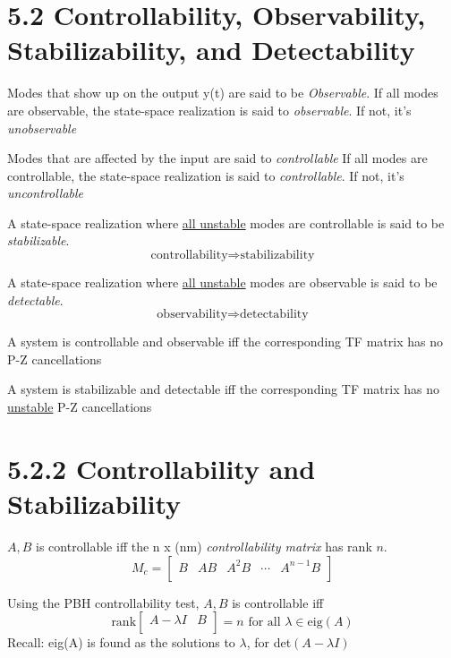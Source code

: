 
\section*{5.2 Controllability, Observability, Stabilizability, and Detectability}
Modes that show up on the output y(t) are said to be \textit{Observable}.
If all modes are observable, the state-space realization is said to \textit{observable}.
If not, it's \textit{unobservable}

Modes that are affected by the input are said to \textit{controllable}
If all modes are controllable, the state-space realization is said to \textit{controllable}.
If not, it's \textit{uncontrollable}

A state-space realization where \underline{all unstable} modes are controllable is said to be \textit{stabilizable}.
\begin{equation*}
    \text{controllability} \Rightarrow \text{stabilizability}
\end{equation*}

A state-space realization where \underline{all unstable} modes are observable is said to be \textit{detectable}.
\begin{equation*}
    \text{observability} \Rightarrow \text{detectability}
\end{equation*}

A system is controllable and observable iff the corresponding TF matrix has no P-Z cancellations

A system is stabilizable and detectable iff the corresponding TF matrix has no \underline{unstable} P-Z cancellations

\section*{5.2.2 Controllability and Stabilizability}
\( A, B \) is controllable iff the n x (nm) \textit{controllability matrix} has rank \( n \).
\begin{equation*}
    M_c = \begin{bmatrix}
        B & AB & A^2B & \cdots & A^{n-1}B \\
    \end{bmatrix}
\end{equation*}

Using the PBH controllability test, \( A, B \) is controllable iff
\begin{equation*}
    \text{rank}\begin{bmatrix}
        A - \lambda I & B \\
    \end{bmatrix} = n \text{ for all } \lambda \in \text{eig}(A)
\end{equation*}
Recall: eig(A) is found as the solutions to \( \lambda \), for det\( ( A - \lambda I ) \)

